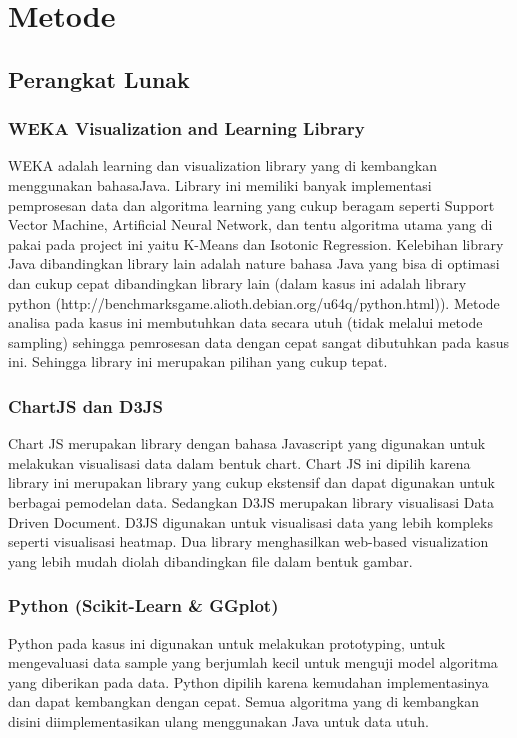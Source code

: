 \documentclass{article}
\begin{document}
\section{Metode}

\subsection{Perangkat Lunak}

\subsubsection{WEKA Visualization and Learning Library}

WEKA adalah learning dan visualization library yang di kembangkan menggunakan bahasaJava. Library ini memiliki banyak implementasi pemprosesan data dan algoritma learning yang cukup beragam seperti Support Vector Machine, Artificial Neural Network, dan tentu algoritma utama yang di pakai pada project ini yaitu K-Means dan Isotonic Regression. Kelebihan library Java dibandingkan library lain adalah nature bahasa Java yang bisa di optimasi dan cukup cepat dibandingkan library lain (dalam kasus ini adalah library python (http://benchmarksgame.alioth.debian.org/u64q/python.html)). Metode analisa pada kasus  ini membutuhkan data secara utuh (tidak melalui metode sampling) sehingga pemrosesan data dengan cepat sangat dibutuhkan pada kasus ini. Sehingga library ini merupakan pilihan yang cukup tepat.


\subsubsection{ChartJS dan D3JS}

Chart JS merupakan library dengan bahasa Javascript yang digunakan untuk melakukan visualisasi data dalam bentuk chart. Chart JS ini dipilih karena library ini merupakan library yang cukup ekstensif dan dapat digunakan untuk berbagai pemodelan data. Sedangkan D3JS merupakan library visualisasi Data Driven Document. D3JS digunakan untuk visualisasi data yang lebih kompleks seperti visualisasi heatmap. Dua library menghasilkan web-based visualization yang lebih mudah diolah dibandingkan file dalam bentuk gambar.

\subsubsection{Python (Scikit-Learn \& GGplot)}

Python pada kasus ini digunakan untuk melakukan prototyping, untuk mengevaluasi data sample yang berjumlah kecil untuk menguji model algoritma yang diberikan pada data. Python dipilih karena kemudahan implementasinya dan dapat kembangkan dengan cepat. Semua algoritma yang di  kembangkan disini diimplementasikan ulang menggunakan Java untuk data utuh.
\end{document}
